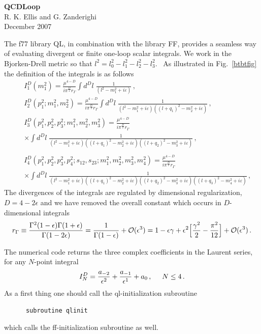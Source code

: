 \documentclass{article}
\def\cG{r_\Gamma}
\def\nn{\nonumber}
\def\beq{\begin{displaymath}}
\def\eeq{\end{displaymath}}
\def\e{\epsilon}
\begin{document}
\begin{center}
{\bf \Large QCDLoop}\\
\vspace{0.3cm}
{\Large R. K. Ellis and G. Zanderighi}\\
\vspace{0.3cm}
December 2007
\end{center}

The f77 library QL, in combination with the library FF, provides
a seamless way of evaluating divergent or finite one-loop scalar
integrals.  We work in the Bjorken-Drell metric so that
$l^2=l_0^2-l_1^2-l_2^2-l_3^2$. \ As illustrated in Fig.~\ref{btbtfig}
the definition of the integrals is as follows
\begin{eqnarray}
&& I^{D}_1(m_1^2)  =
 \frac{\mu^{4-D}}{i \pi^{\frac{D}{2}}\cG}\int d^D l \;
 \frac{1}{(l^2-m_1^2+i\varepsilon)}\,, \nn \\
&& I^{D}_2(p_1^2;m_1^2,m_2^2)  =
 \frac{\mu^{4-D}}{i \pi^{\frac{D}{2}}\cG}\int d^D l \;
 \frac{1}
{(l^2-m_1^2+i\varepsilon)
((l+q_1)^2-m_2^2+i\varepsilon)}\,,\nn \\
&& I^{D}_3(p_1^2,p_2^2,p_3^2;m_1^2,m_2^2,m_3^2)  =
\frac{\mu^{4-D}}{i \pi^{\frac{D}{2}}\cG}
\nn \\
&& \times \int d^D l \;
 \frac{1}
{(l^2-m_1^2+i\varepsilon)
((l+q_1)^2-m_2^2+i\varepsilon)
((l+q_2)^2-m_3^2+i\varepsilon)}\,,\nn \\
&&\nn \\
&&
I^{D}_4(p_1^2,p_2^2,p_3^2,p_4^2;s_{12},s_{23};m_1^2,m_2^2,m_3^2,m_4^2)
=
\frac{\mu^{4-D}}{i \pi^{\frac{D}{2}}\cG}
\nn \\
&&
\times \int d^D l \;
 \frac{1}
{(l^2-m_1^2+i\varepsilon)
((l+q_1)^2-m_2^2+i\varepsilon)
((l+q_2)^2-m_3^2+i\varepsilon)
((l+q_3)^2-m_4^2+i\varepsilon)}\,, \nn
\end{eqnarray}
The divergences of the integrals are regulated by dimensional
regularization, $D=4-2 \epsilon$ and we have removed the overall
constant which occurs in $D$-dimensional integrals
\beq
\cG\equiv\frac{\Gamma^2(1-\e)\Gamma(1+\e)}{\Gamma(1-2\e)} =
\frac{1}{\Gamma(1-\e)} +{\cal O}(\e^3) =
1-\e \gamma+\e^2\Big[\frac{\gamma^2}{2}-\frac{\pi^2}{12}\Big]
+{\cal O}(\e^3)\,.
\nn
\eeq

The numerical code returns the three complex coefficients in the
Laurent series, for any $N$-point integral
\beq
I_N^D = \frac{a_{-2}}{\e^2}+\frac{a_{-1}}{\e^1}+a_0\,,\hspace{.5cm} N\leq 4 \,.
\nn
\eeq
%
As a first thing one should call the ql-initialization subroutine
\begin{verbatim}
      subroutine qlinit
\end{verbatim}
which calls the ff-initialization subroutine as well.
\end{document}
